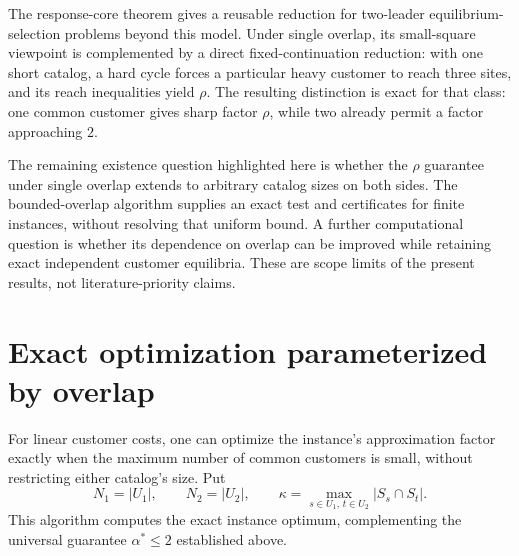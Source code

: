 \documentclass[11pt]{article}
\theoremstyle{definition}
\theoremstyle{remark}
\newcommand{\rhoG}{\rho}
\newcommand{\Uone}{U_1}
\newcommand{\Utwo}{U_2}
\begin{document}
The response-core theorem gives a reusable reduction for two-leader equilibrium-selection problems beyond this model. Under single overlap, its small-square viewpoint is complemented by a direct fixed-continuation reduction: with one short catalog, a hard cycle forces a particular heavy customer to reach three sites, and its reach inequalities yield $\rhoG$. The resulting distinction is exact for that class: one common customer gives sharp factor $\rhoG$, while two already permit a factor approaching $2$.

The remaining existence question highlighted here is whether the $\rhoG$ guarantee under single overlap extends to arbitrary catalog sizes on both sides. The bounded-overlap algorithm supplies an exact test and certificates for finite instances, without resolving that uniform bound. A further computational question is whether its dependence on overlap can be improved while retaining exact independent customer equilibria. These are scope limits of the present results, not literature-priority claims.

\appendix
\section{Exact optimization parameterized by overlap}\label{sec:fpt}

For linear customer costs, one can optimize the instance's approximation factor exactly when the maximum number of common customers is small, without restricting either catalog's size. Put
\[
 N_1=|\Uone|,\qquad N_2=|\Utwo|,\qquad
 \kappa=\max_{s\in\Uone,\,t\in\Utwo}|S_s\cap S_t|.
\]
This algorithm computes the exact instance optimum, complementing the universal guarantee $\alpha^*\le2$ established above.
\end{document}
